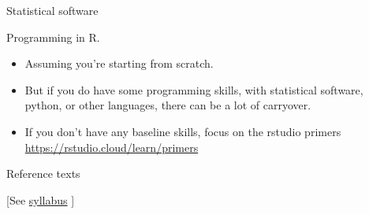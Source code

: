 \documentclass[xcolor={dvipsnames}]{beamer}
\begin{document}

\begin{frame}{Statistical software}

Programming in R.\pause
\begin{itemize}
\item Assuming you're starting from scratch. \pause
\item But if you do have some programming skills, with statistical software, python, or other languages, there can be a lot of carryover. \pause
\item If you don't have any baseline skills, focus on the rstudio primers \url{https://rstudio.cloud/learn/primers}
\end{itemize}

\end{frame}



\begin{frame}{Reference texts}

\begin{center}
{[}See \href{https://docs.google.com/document/d/1wiQwd5HgVohVTC46dfHo67dQ2KBJjNmdO2Pyv5e2Q_s/edit?usp=sharing}{syllabus} {]}
\end{center}

\end{frame}



\end{document}
